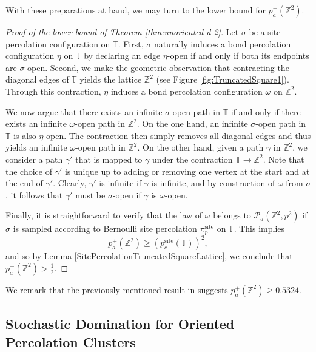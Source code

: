\documentclass[11pt]{article}
\newcommand{\Z}{\mathbb{Z}}
\theoremstyle{remark}
\begin{document}
With these preparations at hand, we may turn to the lower bound for $p_a^+(\mathbb{Z}^2)$.

\begin{proof}[Proof of the lower bound of Theorem \ref{thm:unoriented-d-2}]
    Let $\sigma$ be a site percolation configuration on $\mathbb{T}$. First, $\sigma$ naturally induces a bond percolation configuration $\eta$ on $\mathbb T$ by declaring an edge $\eta$-open if and only if both its endpoints are $\sigma$-open.
    Second, we make the geometric observation that contracting the diagonal edges of $\mathbb{T}$ yields the lattice $\mathbb{Z}^2$ (see Figure \ref{fig:TruncatedSquare1}). Through this contraction, $\eta$ induces a bond percolation configuration $\omega$ on $\Z^2$.

     We now argue that there exists an infinite $\sigma$-open path in $\mathbb T$ if and only if there exists an infinite $\omega$-open path in $\Z^2$.
     On the one hand, an infinite $\sigma$-open path in $\mathbb T$ is also $\eta$-open. The contraction then simply removes all diagonal edges and thus yields an infinite $\omega$-open path in $\Z^2$. On the other hand, given a path $\gamma$ in $\Z^2$, we consider a path $\gamma'$ that is mapped to $\gamma$ under the contraction $\mathbb T \to \Z^2$. Note that the choice of $\gamma'$ is unique up to adding or removing one vertex at the start and at the end of $\gamma'$.   Clearly, $\gamma'$ is infinite if $\gamma$ is infinite, and by construction of $\omega$ from $\sigma$, it follows that  $\gamma'$ must be $\sigma$-open if $\gamma$ is $\omega$-open.  

     Finally, it is straightforward to verify that the law of $\omega$ belongs to $\mathcal{P}_a(\Z^2, p^2)$ if $\sigma$ is sampled according to Bernoulli site percolation $\pi_p^{\mathrm{site}}$ on $\mathbb T$. This implies 
     \begin{equation}
         p_a^+(\Z^2) \ge \left(p_c^{\mathrm{site}}(\mathbb T)\right)^2,
     \end{equation}
    and so by Lemma \ref{SitePercolationTruncatedSquareLattice}, we conclude that $p_a^+(\Z^2) > \frac{1}{2}$.
\end{proof}

We remark that the previously mentioned result in \cite{jacobsen2014high} suggests
$p^+_a(\mathbb{Z}^2) \ge 0.5324$.

\subsection{Stochastic Domination for Oriented Percolation Clusters}\label{sec:StochasticDominationOrientedClusters}
\end{document}
